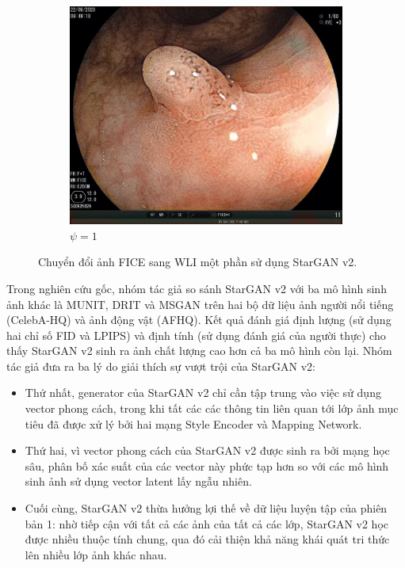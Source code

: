 \documentclass[12pt]{extreport}
\begin{document}
\begin{figure}[H]
\begin{subfigure}[H]{0.19\textwidth}
        \includegraphics[width=\linewidth]{psi/1.jpeg}
        \caption{$ \psi = 1 $}
    \end{subfigure}
    \caption{Chuyển đổi ảnh FICE sang WLI một phần sử dụng StarGAN v2.}
\end{figure}

Trong nghiên cứu gốc, nhóm tác giả so sánh StarGAN v2 với ba mô hình sinh ảnh khác là MUNIT, DRIT và MSGAN trên hai bộ dữ liệu ảnh người nổi tiếng (CelebA-HQ) và ảnh động vật (AFHQ). Kết quả đánh giá định lượng (sử dụng hai chỉ số FID và LPIPS) và định tính (sử dụng đánh giá của người thực) cho thấy StarGAN v2 sinh ra ảnh chất lượng cao hơn cả ba mô hình còn lại. Nhóm tác giả đưa ra ba lý do giải thích sự vượt trội của StarGAN v2:
\begin{itemize}
    \item Thứ nhất, generator của StarGAN v2 chỉ cần tập trung vào việc sử dụng vector phong cách, trong khi tất các các thông tin liên quan tới lớp ảnh mục tiêu đã được xử lý bởi hai mạng Style Encoder và Mapping Network.
    \item Thứ hai, vì vector phong cách của StarGAN v2 được sinh ra bởi mạng học sâu, phân bố xác suất của các vector này phức tạp hơn so với các mô hình sinh ảnh sử dụng vector latent lấy ngẫu nhiên.
    \item Cuối cùng, StarGAN v2 thừa hưởng lợi thế về dữ liệu luyện tập của phiên bản 1: nhờ tiếp cận với tất cả các ảnh của tất cả các lớp, StarGAN v2 học được nhiều thuộc tính chung, qua đó cải thiện khả năng khái quát tri thức lên nhiều lớp ảnh khác nhau.
\end{itemize}
\end{document}
